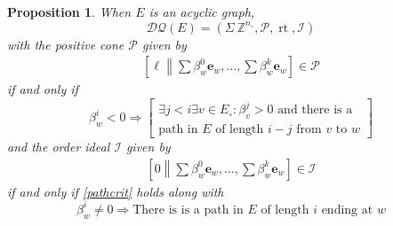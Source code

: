 \documentclass[12pt]{amsbook}%
\newcommand{\rt}{\operatorname{rt}}
\newcommand{\ee}{{\mathbf e}}
\newtheorem{propo}[theor]{Proposition}
\theoremstyle{defin}
\theoremstyle{remark}
\numberwithin{equation}{chapter}
\numberwithin{theor}{section}
\newcommand{\ZZ}{\mathbb{Z}}
\newcommand{\DQ}{\mathcal{DQ}}
\newcommand{\nsX}{\Sigma\ }
\newcommand{\oXe}[2]{\left[#1\left\|{#2}\right.\right]}
\newcommand{\singX}{{\circ}}
\newcommand{\nos}{{n_\singX}}
\begin{document}
\begin{propo}\label{descaforder} When $E$ is an acyclic graph,
\[
\DQ(E)=(\nsX \ZZ^\nos,\mathcal P,\rt,\mathcal I)
\]
with the positive cone $\mathcal P$ given by
\begin{gather*}
\oXe{\ell}{\textstyle \sum \beta^0_w\ee_w,\dots,\sum \beta^k_w\ee_w}\in\mathcal P
\end{gather*}
if and only if 
\begin{equation}\label{pathcrit}
\beta^i_w<0\Longrightarrow\left[\begin{array}{c}\exists j<i\exists v\in E_\singX: \beta^j_v>0\text{ and there is a}\\\text{path in }E\text{ of length }i-j\text{ from } v \text{ to } w\end{array}\right]
\end{equation}
and the order ideal $\mathcal I$ given by
\begin{gather*}
\oXe{0}{\textstyle \sum \beta^0_w\ee_w,\dots,\sum \beta^k_w\ee_w}\in\mathcal I
\end{gather*}
if and only if \eqref{pathcrit} holds along with
\[
\beta^i_w\not= 0\Longrightarrow\text{There is is a path in }E\text{  of length }i\text{ ending at }w 
\]
\end{propo}
\end{document}
